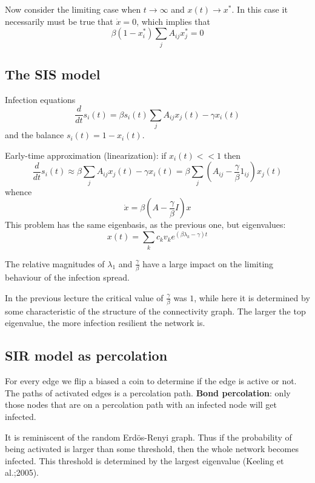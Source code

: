 \documentclass[a4paper]{article}
\begin{document}
Now consider the limiting case when $t\to\infty$ and $x(t)\to x^*$. In this case it
necessarily must be true that $\dot{x} = 0$, which implies that 
\[\beta (1-x^*_i) \sum_j A_{ij} x^*_j = 0\]


\subsection{The SIS model} %
\label{sub:the_sis_model}

Infection equations
\[\frac{d}{dt} s_i(t) = \beta s_i(t) \sum_j A_{ij} x_j(t) - \gamma x_i(t)\]
and the balance $s_i(t) = 1 - x_i(t)$.

Early-time approximation (linearization): if $x_i(t) << 1$ then
\[
\frac{d}{dt} s_i(t)
\approx \beta \sum_j A_{ij} x_j(t) - \gamma x_i(t)
= \beta \sum_j (A_{ij} - \frac{\gamma}{\beta} 1_{ij}) x_j(t)
\]
whence
\[\dot{x} = \beta (A - \frac{\gamma}{\beta} I) x\]
This problem has the same eigenbasis, as the previous one, but 
eigenvalues:
\[x(t) = \sum_k c_k v_k e^{(\beta \lambda_k - \gamma )t} \]

The relative magnitudes of $\lambda_1$ and $\frac{\gamma}{\beta}$ have a large
impact on the limiting behaviour of the infection spread.

In the previous lecture the critical value of $\frac{\gamma}{\beta}$ was $1$, while
here it is determined by some characteristic of the structure of the connectivity
graph. The larger the top eigenvalue, the more infection resilient the network is.


\subsection{SIR model as percolation} %
\label{sub:sir_model_as_percolation}

For every edge we flip a biased a coin to determine if the edge is active or not. The
paths of activated edges is a percolation path. \textbf{Bond percolation}: only those
nodes that are on a percolation path with an infected node will get infected.

It is reminiscent of the random Erd\"os-Renyi graph. Thus if the probability of being
activated is larger than some threshold, then the whole network becomes infected. This
threshold is determined by the largest eigenvalue (Keeling et al.;2005).
\end{document}

